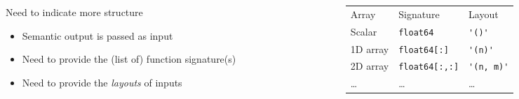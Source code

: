 \documentclass[10pt, aspectratio=1610]{beamer}
\begin{document}
\begin{frame}[fragile]
  \begin{columns}
    \begin{column}{0.45\textwidth}
      Need to indicate more structure
      \begin{itemize}\small
        \item Semantic output is passed as input
        \item Need to provide the (list of) function signature(s)
        \item Need to provide the \emph{layouts} of inputs
      \end{itemize}
    \end{column}
    \begin{column}{0.35\textwidth}
      \begin{table}
        \footnotesize
        \begin{tabular}{lll}
          \toprule
          Array & Signature & Layout \\
          \cmidrule{2-3}
          Scalar & \lstinline[]!float64! & \lstinline[]!'()'! \\
          1D array & \lstinline[]!float64[:]! & \lstinline[]!'(n)'! \\
          2D array & \lstinline[]!float64[:,:]! & \lstinline[]!'(n, m)'! \\
          \dots & \dots & \dots \\
          \bottomrule
        \end{tabular}
      \end{table}
    \end{column}
  \end{columns}

\end{frame}
\end{document}
